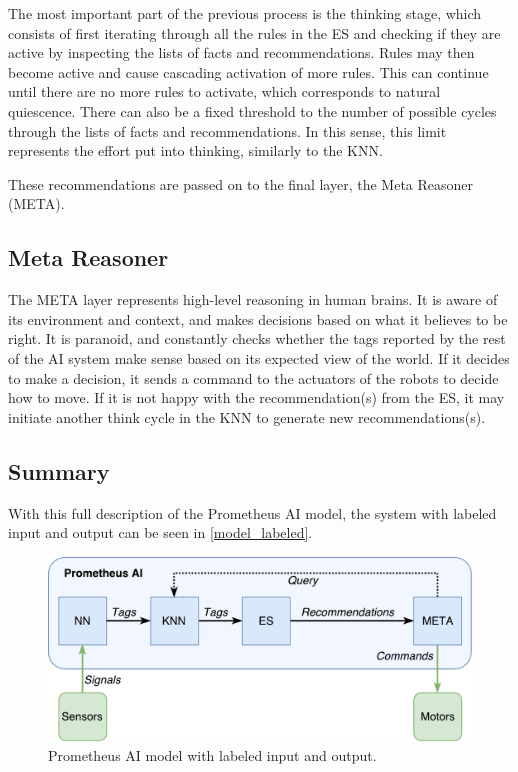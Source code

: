 \documentclass[titlepage,11pt]{article}
\begin{document}
The most important part of the previous process is the thinking stage, which consists of first iterating through all the rules in the ES and checking if they are active by inspecting the lists of facts and recommendations. Rules may then become active and cause cascading activation of more rules. This can continue until there are no more rules to activate, which corresponds to natural quiescence. There can also be a fixed threshold to the number of possible cycles through the lists of facts and recommendations. In this sense, this limit represents the effort put into thinking, similarly to the KNN.

These recommendations are passed on to the final layer, the Meta Reasoner (META).

\subsection{Meta Reasoner}

The META layer represents high-level reasoning in human brains. It is aware of its environment and context, and makes decisions based on what it believes to be right. It is paranoid, and constantly checks whether the tags reported by the rest of the AI system make sense based on its expected view of the world. If it decides to make a decision, it sends a command to the actuators of the robots to decide how to move. If it is not happy with the recommendation(s) from the ES, it may initiate another think cycle in the KNN to generate new recommendations(s).

\subsection{Summary}

With this full description of the Prometheus AI model, the system with labeled input and output can be seen in \autoref{model_labeled}.

\begin{figure}[!htb]
	\includegraphics[width=\textwidth]{figures/ai_model_labeled.pdf}
	\caption{Prometheus AI model with labeled input and output.}
	\label{model_labeled}
\end{figure}
\end{document}
